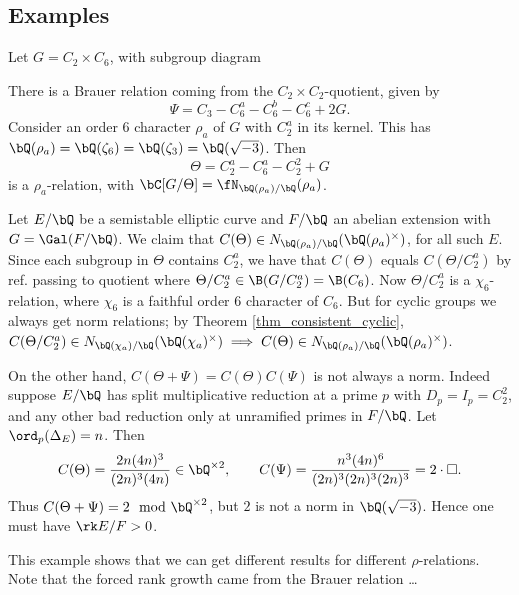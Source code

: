 \newpage
\subsection{Examples}

\begin{example}
    Let $G = C_2 \times C_6$, with subgroup diagram
    \begin{figure}[H]
        \centering
    \end{figure}
    There is a Brauer relation coming from the $C_2 \times C_2$-quotient, given by $$\Psi = C_3 - C_6^a - C_6^b - C_6^c + 2G.$$ Consider an order $6$ character $\rho_a$ of $G$ with $C_2^{a}$ in its kernel. This has $\bQ(\rho_a) = \bQ(\zeta_6) = \bQ(\zeta_3) = \bQ(\sqrt{-3})$. Then $$\Theta = C_2^{a} - C_6^{a} - C_2^{2} + G$$ is a $\rho_a$-relation, with $\bC[ G / \Theta] = \repnorm{\rho_a}$. 

    Let $E / \bQ$ be a semistable elliptic curve and $F / \bQ$ an abelian extension with $G = \Gal(F / \bQ)$. We claim that $C(\Theta) \in \fieldnorm{\rho_a}$, for all such $E$. Since each subgroup in $\Theta$ contains $C_2^{a}$, we have that $C(\Theta)$ equals $C(\Theta / C_2^{a})$ {\color{red} by ref. passing to quotient} where $\Theta / C_2^{a} \in \B(G / C_2^{a}) = \B(C_6)$.  Now $\Theta / C_2^{a}$ is a $\chi_6$-relation, where $\chi_6$ is a faithful order $6$ character of $C_6$. But for cyclic groups we always get norm relations; by Theorem \ref{thm_consistent_cyclic}, $C(\Theta / C_2^{a}) \in \fieldnorm{\chi_a} \implies C(\Theta) \in \fieldnorm{\rho_a}$.

    On the other hand, $C(\Theta + \Psi) = C(\Theta)C(\Psi)$ is not always a norm. Indeed suppose $E / \bQ$ has split multiplicative reduction at a prime $p$ with $D_p = I_p = C_2^{2}$, and any other bad reduction only at unramified primes in $F / \bQ$. Let $\ord_p(\Delta_E) = n$. Then 
        $$C(\Theta) = \frac{2n(4n)^3}{(2n)^3 (4n)} \in \bQ^{\times 2}, \qquad
            C(\Psi) = \frac{n^3(4n)^6}{(2n)^3(2n)^3(2n)^3} = 2 \cdot \square.$$
    Thus $C(\Theta + \Psi) = 2 \mod \bQ^{\times 2}$, but $2$ is not a norm in $\bQ(\sqrt{-3})$. Hence one must have $\rk E / F > 0$. 

    This example shows that we can get different results for different $\rho$-relations. Note that the forced rank growth came from the Brauer relation {\color{red} \ldots}


\end{example}